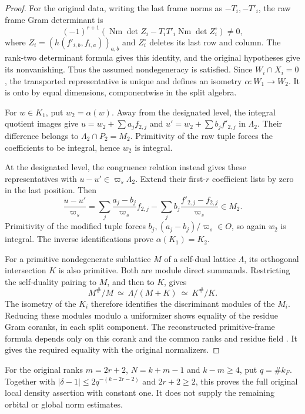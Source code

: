\begin{proof}
For the original data, writing the last frame norms as $-T_i,-T'_i$,
the raw frame Gram determinant is
\[
 (-1)^{r+1}
 \left(\operatorname{Nm}\det Z_i
       -T_iT'_i\operatorname{Nm}\det Z_i^\circ\right)\ne0,
\]
where $Z_i=(h(f'_{i,b},f_{i,a}))_{a,b}$ and $Z_i^\circ$ deletes its
last row and column. The rank-two determinant formula gives this
identity, and the original hypotheses give its nonvanishing.
Thus the assumed nondegeneracy is satisfied. Since
$W_i\cap X_i=0$, the transported representative is unique and defines
an isometry $\alpha:W_1\to W_2$. It is onto by equal dimensions,
componentwise in the split algebra.

For $w\in K_1$, put $w_2=\alpha(w)$. Away from the designated level,
the integral quotient images give
$u=w_2+\sum a_jf_{2,j}$ and
$u'=w_2+\sum b_jf'_{2,j}$ in $\Lambda_2$.
Their difference belongs to $\Lambda_2\cap P_2=M_2$.
Primitivity of the raw tuple forces the coefficients to be integral,
hence $w_2$ is integral.

At the designated level, the congruence relation instead gives these
representatives with $u-u'\in\varpi_s\Lambda_2$. Extend their
first-$r$ coefficient lists by zero in the last position. Then
\[
 \frac{u-u'}{\varpi_s}
   =\sum_j\frac{a_j-b_j}{\varpi_s}f_{2,j}
     -\sum_j b_j\frac{f'_{2,j}-f_{2,j}}{\varpi_s}\in M_2.
\]
Primitivity of the modified tuple forces
$b_j,(a_j-b_j)/\varpi_s\in O$, so again $w_2$ is integral.
The inverse identifications prove $\alpha(K_1)=K_2$.

For a primitive nondegenerate sublattice $M$ of a self-dual lattice
$\Lambda$, its orthogonal intersection $K$ is also primitive.
Both are module direct summands. Restricting the self-duality pairing
to $M$, and then to $K$, gives
\[
 M^\#/M\ \simeq\ \Lambda/(M+K)\ \simeq\ K^\#/K.
\]
The isometry of the $K_i$ therefore identifies the discriminant
modules of the $M_i$. Reducing these modules modulo a uniformizer
shows equality of the residue Gram coranks, in each split component.
The reconstructed primitive-frame formula depends only on this
corank and the common ranks and residue field \cite{reconstruction}.
It gives the required equality with the original normalizers.
\end{proof}

For the original ranks $m=2r+2$, $N=k+m-1$ and $k-m\ge4$, put
$q=\#k_F$. Together with $|\delta-1|\le2q^{-(k-2r-2)}$ and $2r+2\ge2$,
this proves the full original local density assertion with constant
one. It does not supply the remaining orbital or global norm estimates.
